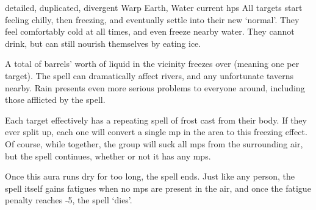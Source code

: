   {detailed, duplicated, divergent}%
  {Warp}%
  {Earth, Water}%
  {current \glspl{hp}}%
  {All  targets start feeling chilly, then freezing, and eventually settle into their new `normal'.
    They feel comfortably cold at all times, and even freeze nearby water.
    They cannot drink, but can still nourish themselves by eating ice.}%
  {A total of  barrels' worth of liquid in the vicinity freezes over (meaning one per target).
    The spell can dramatically affect rivers, and any unfortunate taverns nearby.
    Rain presents even more serious problems to everyone around, including those afflicted by the spell.

    Each target effectively has a repeating spell of frost cast from their body.
    If they ever split up, each one will convert a single \gls{mp} in the area to this freezing effect.
    Of course, while together, the group will suck all \glspl{mp} from the surrounding air, but the spell continues, whether or not it has any \glspl{mp}.

    Once this aura runs dry for too long, the spell ends.
    Just like any person, the spell itself gains \glspl{fatigue} when no \glspl{mp} are present in the air, and once the \gls{fatigue} penalty reaches -5, the spell `dies'.
  }

